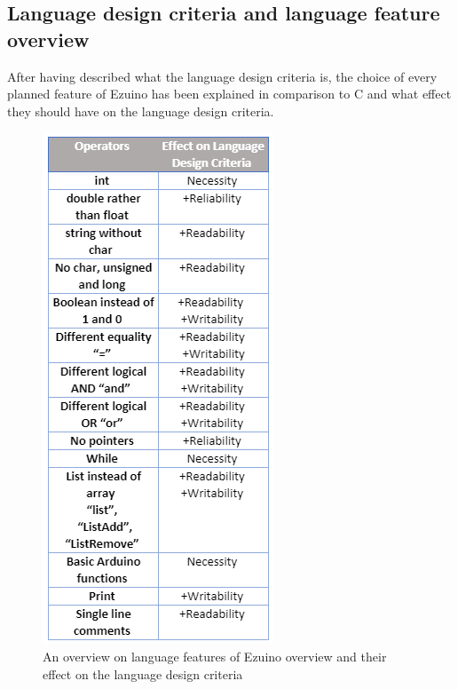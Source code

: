 \subsection*{Language design criteria and language feature overview}
After having described what the language design criteria is, the choice of every planned feature of Ezuino has been explained in comparison to C and what effect they should have on the language design criteria.
\begin{figure}[H]
\centering
\caption{An overview on language features of Ezuino overview and their effect on the language design criteria}
\includegraphics[scale=0.80]{figures/language_features/Operators-and-effect-on-language-criteria.png}

\label{feature-overview}
\end{figure}